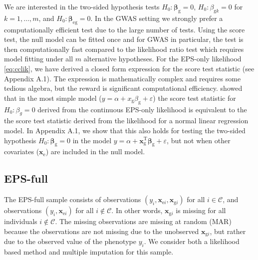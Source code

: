 \documentclass[10pt,a4paper]{article}
\def\bbetag{\bm{\beta}_{\text{g}}}
\def\betagk{\beta_{\text{g}k}}
\def\bbetaeg{\bm{\beta}_{\text{eg}}}
\def\bxgi{\mathbf{x}_{\text{g}i}}
\def\bxei{\mathbf{x}_{\text{e}i}}
\def\bxg{\mathbf{x}_{\text{g}}}
\def\bxe{\mathbf{x}_{\text{e}}}
\begin{document}
We are interested in the two-sided hypothesis tests $H_0: \bbetag = 0$, $H_0: \betagk = 0$ for $k = 1,\ldots,m$, and $H_0: \bbetaeg = 0$. In the GWAS setting we strongly prefer a computationally efficient test due to the large number of tests. Using the score test, the null model can be fitted once and for GWAS in particular, the test is then computationally fast compared to the likelihood ratio test which requires model fitting under all $m$ alternative hypotheses. For the EPS-only likelihood \eqref{eq:cclik}, we have derived a closed form expression for the score test statistic (see Appendix A.1). The expression is mathematically complex and requires some tedious algebra, but the reward is significant computational efficiency. \cite{tang2010equivalence} showed that in the most simple model ($y = \alpha + x_{\text{g}} \beta_{\text{g}} + \varepsilon$) the score test statistic for $H_0: \beta_g = 0$ derived from the continuous EPS-only likelihood is equivalent to the the score test statistic derived from the likelihood for a normal linear regression model. In Appendix A.1, we show that this also holds for testing the two-sided hypothesis $H_0: \bbetag = 0$ in the model $y = \alpha + \bxg^{\text{T}} \bbetag + \varepsilon$, but not when other covariates ($\bxe$) are included in the null model.

\subsection{EPS-full}
The EPS-full sample consists of observations $(y_i, \bxei,\bxgi)$ for all $ i \in \mathcal{C}$, and observations $(y_i,\bxei)$ for all $i \not \in \mathcal{C}$. In other words, $\bxgi$ is missing for all individuals $i \not \in \mathcal{C}$. The missing observations are missing at random (MAR) because the observations are not missing due to the unobserved $\bxgi$, but rather due to the observed value of the phenotype $y_i$. We consider both a likelihood based method and multiple imputation for this sample.
\end{document}
